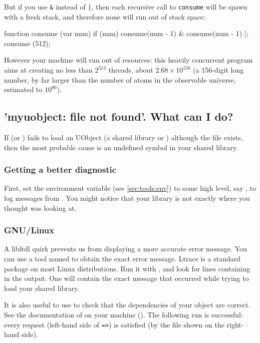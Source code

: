 But if you use \lstinline{&} instead of \lstinline{|}, then each
recursive call to \lstinline{consume} will be spawn with a fresh
stack, and therefore none will run out of stack space:

\begin{urbiunchecked}
function consume (var num)
{
  if (num)
    consume(num - 1) & consume(num - 1)
}|;
consume (512);
\end{urbiunchecked}

However your machine will run out of resources: this heavily
concurrent program aims at creating no less than $2^{513}$ threads,
about $2.68 \times 10^{156}$ (a 156-digit long number, by far larger
than the number of atoms in the observable universe, estimated to
$10^{80}$).

\subsection{'myuobject: file not found'. What can I do?}
If  (or ) fails to load an UObject (a
shared library or ) although the file exists, then the most
probable cause is an undefined symbol in your shared library.

\subsubsection{Getting a better diagnostic}
First, set the  environment variable (see
\autoref{sec:tools:env}) to some high level, say , to log
messages from .  You might notice that your library is
not exactly where you thought  was looking at.

\subsubsection{GNU/Linux}
A libltdl quirk prevents us from displaying a more accurate error message.
You can use a tool named  to obtain the exact error message.
Ltrace is a standard package on most Linux distributions.  Run it with
, and look for lines containing
 in the output. One will contain the exact message that
occurred while trying to load your shared library.

It is also useful to use  to check that the dependencies of
your object are correct.  See the documentation of  on your
machine ().  The following run is successful: every request
(left-hand side of \lstinline{=>}) is satisfied (by the file shown on the
right-hand side).

